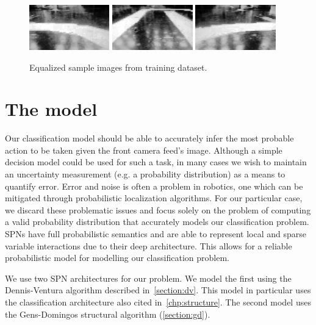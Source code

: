 \begin{figure}[h]
  \centering\includegraphics[width=0.31\textwidth]{imgs/eq_left.png}
  \includegraphics[width=0.31\textwidth]{imgs/eq_up.png}
  \includegraphics[width=0.31\textwidth]{imgs/eq_right.png}
  \caption{Equalized sample images from training dataset.\label{fig:dataset_equalized}}
\end{figure}

\section{The model}

Our classification model should be able to accurately infer the most probable action to be taken
given the front camera feed's image. Although a simple decision model could be used for such a
task, in many cases we wish to maintain an uncertainty measurement (e.g. a probability
distribution) as a means to quantify error. Error and noise is often a problem in robotics, one
which can be mitigated through probabilistic localization algorithms. For our particular case, we
discard these problematic issues and focus solely on the problem of computing a valid probability
distribution that accurately models our classification problem. SPNs have full probabilistic
semantics and are able to represent local and sparse variable interactions due to their deep
architecture. This allows for a reliable probabilistic model for modelling our classification
problem.

We use two SPN architectures for our problem. We model the first using the Dennis-Ventura algorithm
described in~\autoref{section:dv}. This model in particular uses the classification architecture
also cited in~\autoref{chp:structure}. The second model uses the Gens-Domingos structural algorithm
(\autoref{section:gd}).


